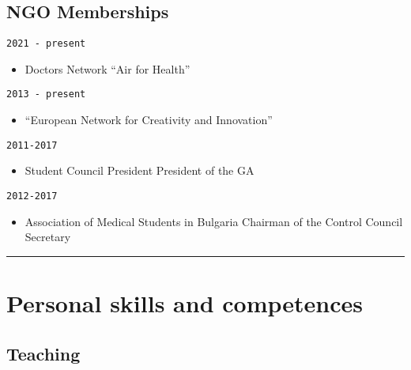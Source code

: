 \documentclass[
  12pt,
  letterpaper,
  DIV=11,
  numbers=noendperiod]{scrartcl}
\providecommand{\tightlist}{%
  \setlength{\itemsep}{0pt}\setlength{\parskip}{0pt}}\usepackage{longtable,booktabs,array}
\begin{document}
\subsection{NGO Memberships}\label{ngo-memberships}

\texttt{2021\ -\ present}

\begin{itemize}
\tightlist
\item
  Doctors Network ``Air for Health''
\end{itemize}

\texttt{2013\ -\ present}

\begin{itemize}
\tightlist
\item
  ``European Network for Creativity and Innovation''
\end{itemize}

\texttt{2011-2017}

\begin{itemize}
\tightlist
\item
  Student Council President \textbar{} President of the GA
\end{itemize}

\texttt{2012-2017}

\begin{itemize}
\tightlist
\item
  Association of Medical Students in Bulgaria \textbar{} Chairman of the
  Control Council \textbar{} Secretary
\end{itemize}

\begin{center}\rule{0.5\linewidth}{0.5pt}\end{center}

\section{Personal skills and
competences}\label{personal-skills-and-competences}

\subsection{Teaching}\label{teaching}
\end{document}
